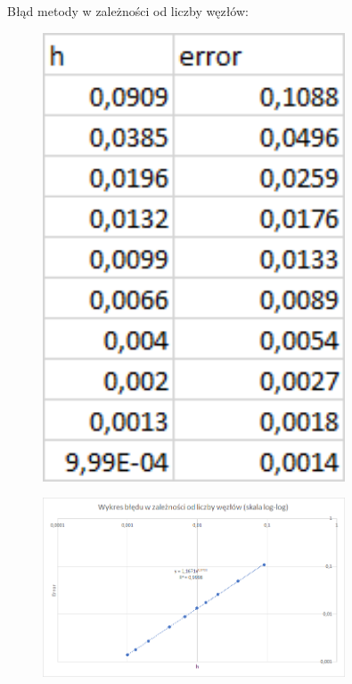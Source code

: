 \newpage

\begin{samepage}
	Błąd metody w zależności od liczby węzłów:
	\begin{figure}[!ht]
		\begin{center}
			\includegraphics[width=0.8\textwidth]{Lab4/charts/zad4/2/error_dane.png}
		\end{center}
	\end{figure}
	\FloatBarrier
\end{samepage} 

\begin{samepage}
	
	\begin{figure}[!ht]
		\begin{center}
			\includegraphics[width=0.8\textwidth]{Lab4/charts/zad4/2/error.png}
		\end{center}
	\end{figure}
	\FloatBarrier
\end{samepage} 

